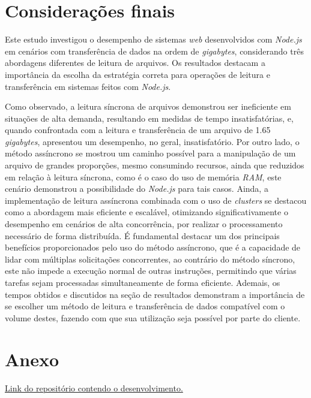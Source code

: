 \documentclass[12pt]{article}
\begin{document}
\section{Considerações finais}

Este estudo investigou o desempenho de sistemas \textit{web} desenvolvidos com \textit{Node.js} em cenários com transferência de dados
na ordem de \textit{gigabytes}, considerando três abordagens diferentes de leitura de arquivos. Os resultados destacam
a importância da escolha da estratégia correta para operações de leitura e transferência em sistemas feitos com \textit{Node.js}.

Como observado, a leitura síncrona de arquivos demonstrou ser ineficiente em situações de alta demanda, resultando em 
medidas de tempo insatisfatórias, e, quando confrontada com a leitura e transferência de um arquivo de 1.65 \textit{gigabytes},
apresentou um desempenho, no geral, insatisfatório. Por outro lado, o método assíncrono se mostrou um caminho possível para a manipulação de um arquivo de
grandes proporções, mesmo consumindo recursos, ainda que reduzidos em relação à leitura síncrona, como é o caso do uso de
memória \textit{RAM}, este cenário demonstrou a possibilidade do \textit{Node.js} para tais casos. Ainda, a implementação 
de leitura assíncrona combinada com o uso de \textit{clusters} se destacou como a abordagem mais eficiente e escalável, otimizando 
significativamente o desempenho em cenários de alta concorrência, por realizar o processamento necessário de forma distribuída. 
É fundamental destacar um dos principais benefícios proporcionados pelo uso do método assíncrono, que é a capacidade de lidar 
com múltiplas solicitações concorrentes, ao contrário do método síncrono, este não impede a execução normal 
de outras instruções, permitindo que várias tarefas sejam processadas simultaneamente de forma eficiente. Ademais, os tempos obtidos 
e discutidos na seção de resultados demonstram a importância de se escolher um método de leitura e transferência de dados compatível
com o volume destes, fazendo com que sua utilização seja possível por parte do cliente.




\pagebreak

\section*{Anexo}

\href{https://github.com/MarcosKrul/tcc}{Link do repositório contendo o desenvolvimento.}
\end{document}
